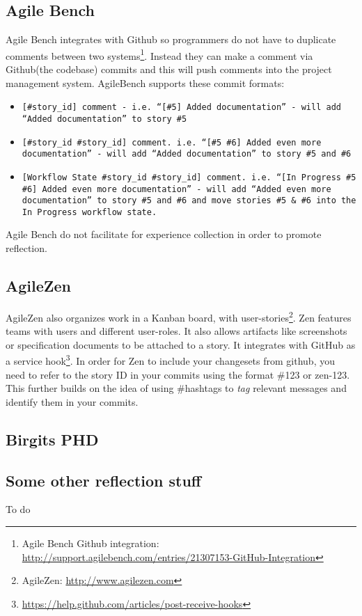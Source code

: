 \subsection*{Agile Bench}
Agile Bench integrates with Github so programmers do not have to duplicate comments between two systems\footnote{Agile Bench Github integration: \url{http://support.agilebench.com/entries/21307153-GitHub-Integration}}. Instead they can make a comment via Github(the codebase) commits and this will push comments into the project management system. AgileBench supports these commit formats: \\
\begin{itemize}
\item \verb|[#story_id] comment - i.e. “[#5] Added documentation” - will add “Added documentation” to story #5|
\item \verb|[#story_id #story_id] comment. i.e. “[#5 #6] Added even more documentation” - will add “Added documentation” to story #5 and #6|
\item \verb|[Workflow State #story_id #story_id] comment. i.e. “[In Progress #5 #6] Added even more documentation” - will add “Added even more documentation” to story #5 and #6 and move stories #5 & #6 into the In Progress workflow state.|
\end{itemize}
Agile Bench do not facilitate for experience collection in order to promote reflection.
\subsection*{AgileZen}
AgileZen also organizes work in a Kanban board, with user-stories\footnote{AgileZen: \url{http://www.agilezen.com}}. Zen features teams with users and different user-roles. It also allows artifacts like screenshots or specification documents to be attached to a story. It integrates with GitHub as a service hook\footnote{\url{https://help.github.com/articles/post-receive-hooks}}. In order for Zen to include your changesets from github, you need to refer to the story ID in your commits using the format \#123 or zen-123. This further builds on the idea of using \#hashtags to \textit{tag} relevant messages and identify them in your commits. 

\subsection{Birgits PHD}

\subsection{Some other reflection stuff}
To do
